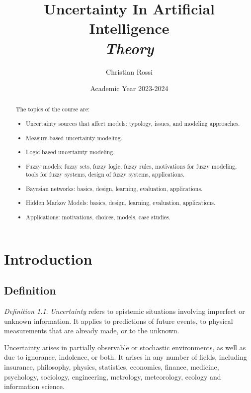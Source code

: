 \documentclass[12pt, a4paper]{report}
\title{Uncertainty In Artificial Intelligence\\ \textit{Theory}}
\author{Christian Rossi}
\date{Academic Year 2023-2024}
\theoremstyle{remark}
\newtheorem*{remark}{Definition}
\begin{document}
\maketitle

\newpage

\begin{abstract}
    The topics of the course are:
    \begin{itemize}
        \item Uncertainty sources that affect models: typology, issues, and modeling approaches.
        \item Measure-based uncertainty modeling.
        \item Logic-based uncertainty modeling.
        \item Fuzzy models: fuzzy sets, fuzzy logic, fuzzy rules, motivations for fuzzy modeling, tools for fuzzy systems, design 
            of fuzzy systems, applications.
        \item Bayesian networks: basics, design, learning, evaluation, applications.
        \item Hidden Markov Models: basics, design, learning, evaluation, applications.
        \item Applications: motivations, choices, models, case studies.
    \end{itemize}
    \end{abstract}

\newpage

\tableofcontents

\newpage

\chapter{Introduction}
    \section{Definition}
    \begin{remark}
        \emph{Uncertainty} refers to epistemic situations involving imperfect or unknown information. It applies to predictions 
        of future events, to physical measurements that are already made, or to the unknown. 
    \end{remark}
    Uncertainty arises in partially observable or stochastic environments, as well as due to ignorance, indolence, or both. It arises 
    in any number of fields, including insurance, philosophy, physics, statistics, economics, finance, medicine, psychology, sociology, 
    engineering, metrology, meteorology, ecology and information science.
    
\end{document}
